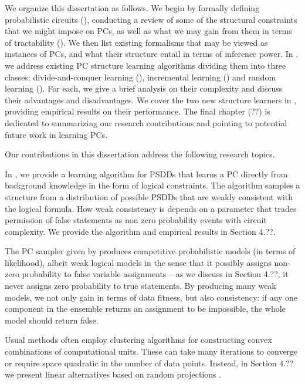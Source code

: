 We organize this dissertation as follows. We begin  by formally defining probabilistic
circuits (), conducting a review of some of the structural constraints that we might
impose on PCs, as well as what we may gain from them in terms of tractability ().
We then list existing formalisms that may be viewed as instances of PCs, and what their structure
entail in terms of inference power. In , we address existing PC structure
learning algorithms dividing them into three classes: divide-and-conquer learning
(), incremental learning () and random learning
(). For each, we give a brief analysis on their complexity and discuss their
advantages and disadvantages. We cover the two new structure learners in ,
providing empirical results on their performance. The final chapter (??) is dedicated to
summarizing our research contributions and pointing to potential future work in learning PCs.

Our contributions in this dissertation address the following research topics.


In \citet{geh21a}, we provide a learning algorithm for PSDDs that learns a PC directly from
background knowledge in the form of logical constraints. The algorithm samples a structure from a
distribution of possible PSDDs that are weakly consistent with the logical formula. How weak
consistency is depends on a parameter that trades permission of false statements as non zero
probability events with circuit complexity. We provide the algorithm and empirical results in
Section 4.??.


The PC sampler given by \citet{geh21a} produces competitive probabilistic models (in terms of
likelihood), albeit weak logical models in the sense that it possibly assigns non-zero probability
to false variable assignments -- as we discuss in Section 4.??, it never assigns zero probability
to true statements. By producing many weak models, we not only gain in terms of data fitness, but
also consistency: if any one component in the ensemble returns an assignment to be impossible, the
whole model should return false.


Usual methods often employ clustering algorithms for constructing convex combinations of
computational units. These can take many iterations to converge or require space quadratic in the
number of data points. Instead, in Section 4.?? we present linear alternatives based on random
projections \citep{dasgupta08a,dasgupta08b}.

